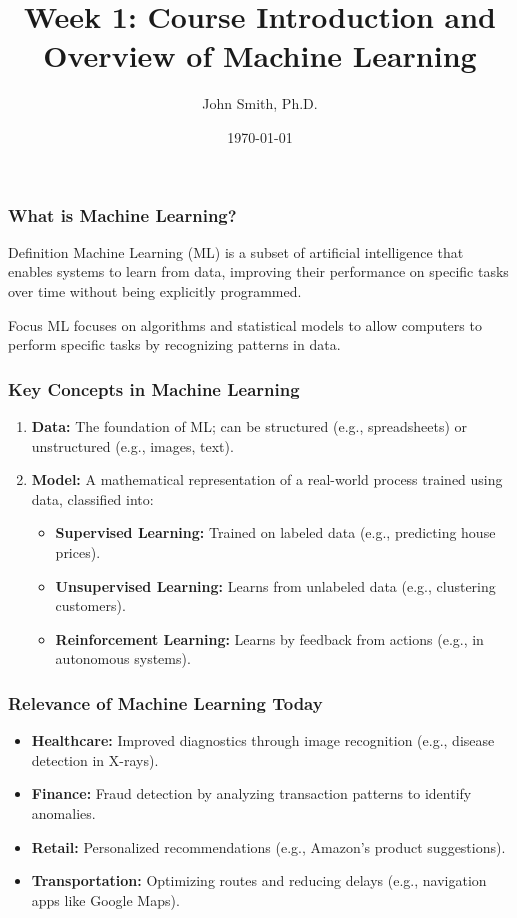 \documentclass[aspectratio=169]{beamer}
\title[Course Introduction]{Week 1: Course Introduction and Overview of Machine Learning}
\author[J. Smith]{John Smith, Ph.D.}
\institute[University Name]{
  Department of Computer Science\\
  University Name\\
  \vspace{0.3cm}
  Email: email@university.edu\\
  Website: www.university.edu
}
\date{\today}
\begin{document}
\frame{\titlepage}

\begin{frame}[fragile]
    \titlepage
\end{frame}

\begin{frame}[fragile]
    \frametitle{What is Machine Learning?}
    \begin{block}{Definition}
        Machine Learning (ML) is a subset of artificial intelligence that enables systems to learn from data, improving their performance on specific tasks over time without being explicitly programmed.
    \end{block}

    \begin{block}{Focus}
        ML focuses on algorithms and statistical models to allow computers to perform specific tasks by recognizing patterns in data.
    \end{block}
\end{frame}

\begin{frame}[fragile]
    \frametitle{Key Concepts in Machine Learning}
    \begin{enumerate}
        \item \textbf{Data:} The foundation of ML; can be structured (e.g., spreadsheets) or unstructured (e.g., images, text).
        
        \item \textbf{Model:} A mathematical representation of a real-world process trained using data, classified into:
        \begin{itemize}
            \item \textbf{Supervised Learning:} Trained on labeled data (e.g., predicting house prices).
            \item \textbf{Unsupervised Learning:} Learns from unlabeled data (e.g., clustering customers).
            \item \textbf{Reinforcement Learning:} Learns by feedback from actions (e.g., in autonomous systems).
        \end{itemize}
    \end{enumerate}
\end{frame}

\begin{frame}[fragile]
    \frametitle{Relevance of Machine Learning Today}
    \begin{itemize}
        \item \textbf{Healthcare:} Improved diagnostics through image recognition (e.g., disease detection in X-rays).
        \item \textbf{Finance:} Fraud detection by analyzing transaction patterns to identify anomalies.
        \item \textbf{Retail:} Personalized recommendations (e.g., Amazon's product suggestions).
        \item \textbf{Transportation:} Optimizing routes and reducing delays (e.g., navigation apps like Google Maps).
    \end{itemize}
\end{frame}
\end{document}
